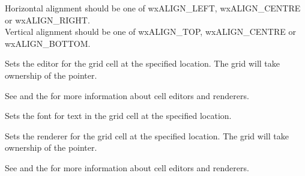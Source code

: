 Horizontal alignment should be one of wxALIGN\_LEFT, wxALIGN\_CENTRE or wxALIGN\_RIGHT. \\
Vertical alignment should be one of wxALIGN\_TOP, wxALIGN\_CENTRE or wxALIGN\_BOTTOM.



\label{wxgridsetcellbackgroundcolour}




\label{wxgridsetcelleditor}


Sets the editor for the grid cell at the specified location.
The grid will take ownership of the pointer.

See  and
the  for more information about cell editors and renderers.



\label{wxgridsetcellfont}


Sets the font for text in the grid cell at the specified location.



\label{wxgridsetcellrenderer}


Sets the renderer for the grid cell at the specified location.
The grid will take ownership of the pointer.

See  and
the  for more information about cell editors and renderers.



\label{wxgridsetcelltextcolour}



